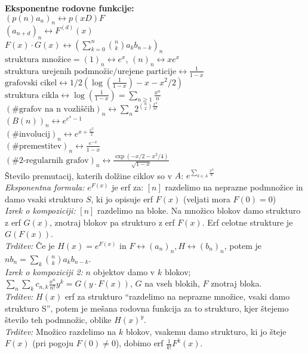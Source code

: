 \documentclass[a4paper, oneside, 12pt]{article}
\theoremstyle{definition}
\newcommand{\rf}{\longleftrightarrow}
\begin{document}
\textbf{Eksponentne rodovne funkcije: }\\
$(p(n) a_n)_n \rf p(x D) F$\\
$(a_{n+d})_n \rf F^{(d)}(x)$\\
$F(x) \cdot G(x) \rf (\sum_{k=0}^{n}\binom{n}{k}a_kb_{n-k})_n$\\
$\text{struktura množice} = (1)_n \rf e^x$, $(n)_n \rf x e^x$\\
$\text{struktura urejenih podmnožic/urejene particije} \rf \frac{1}{1-x}$\\
$\text{grafovski cikel} \rf 1/2 (\log(\frac{1}{1-x}) - x - x^2/2)$\\
$\text{struktura cikla} \rf \log(\frac{1}{1-x}) = \sum_{n\geq1} \frac{x^n}{n}$\\
$(\# \text{grafov na n vozliščih})_n \rf \sum_n 2^{\binom{n}{2} \frac{x^n}{n!}}$\\
$(B(n))_n \rf e^{e^x - 1}$\\
$(\# \text{involucij})_n \rf e^{x + \frac{x^2}{2}}$\\
$(\# \text{premestitev})_n \rf \frac{e^{-x}}{1-x}$\\
$(\# \text{2-regularnih grafov})_n \rf \frac{\exp(-x/2 - x^2/4)}{\sqrt{1-x}}$\\
Število premutacij, katerih dolžine ciklov so v $A$: $e^{\sum_{k \in A} \frac{x^k}{k}}$\\
\textit{Eksponentna formula:} $e^{F(x)}$ je erf za: $[n]$ razdelimo na neprazne podmnožice in damo vsaki strukturo $S$, ki jo opisuje erf $F(x)$ (veljati mora $F(0) = 0$)\\
\textit{Izrek o kompoziciji:} $[n]$ razdelimo na bloke. Na množico blokov damo strukturo z erf $G(x)$, znotraj blokov pa strukturo z erf $F(x)$. Erf celotne strukture je $G(F(x))$.\\
\textit{Trditev:} Če je $H(x) = e^{F(x)}$ in $F \rf (a_n)_n, H \rf (b_n)_n$,
potem je $nb_n = \sum_k \binom{n}{k} a_k b_{n-k}$.\\
\textit{Izrek o kompoziciji 2:} $n$ objektov damo v $k$ blokov; $\sum_n \sum_k c_{n,k} \frac{x^n}{n!} y^k = G(y \cdot F(x))$, $G$ na vseh blokih, $F$ znotraj bloka.\\
\textit{Trditev:} $H(x)$ erf za strukturo ``razdelimo na neprazne množice, vsaki damo strukturo S'', potem je mešana rodovna funkcija za to strukturo, kjer štejemo število teh podmnožic, oblike $H(x)^y$.\\
\textit{Trditev:} Množico razdelimo na $k$ blokov, vsakemu damo strukturo, ki jo šteje $F(x)$ (pri pogoju $F(0) \neq 0$), dobimo erf $\frac{1}{k!}F^k(x).$
\end{document}
